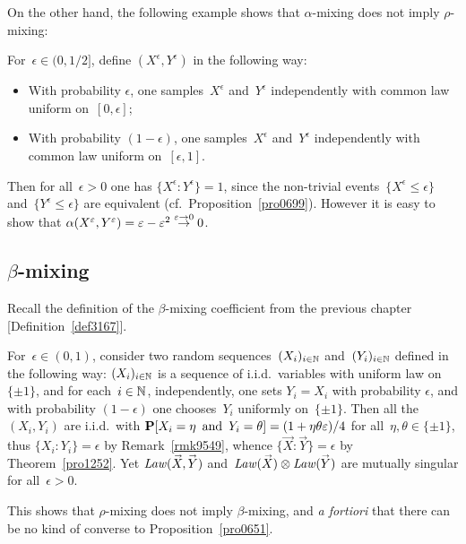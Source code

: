 On the other hand, the following example shows that $\alpha$-mixing does not imply $\rho$-mixing:

\begin{Xpl}\label{x3993}
For~$\epsilon\in (0,1/2]$, define $(X^{\epsilon},Y^{\epsilon})$ in the following way:
\begin{itemize}
\item With probability $\epsilon$, one samples~$X^{\epsilon}$ and~$Y^{\epsilon}$ independently
with common law uniform on~$[0,\epsilon]$;
\item With probability $(1-\epsilon)$, one samples~$X^{\epsilon}$ and~$Y^{\epsilon}$ independently
with common law uniform on~$[\epsilon,1]$.
\end{itemize}
Then for all~$\epsilon>0$ one has $\{X^{\epsilon}:Y^{\epsilon}\}=1$,
since the non-trivial events~${\{X^\epsilon\leq\epsilon\}}$ and~${\{Y^\epsilon\leq\epsilon\}}$
are equivalent (cf.\ Proposition~\ref{pro0699}).
However it is easy to show that $\alpha(X^\varepsilon,Y^\varepsilon) = \varepsilon-\varepsilon^2
\stackrel{\varepsilon\to0}{\to} 0$.
\end{Xpl}


\subsection{\texorpdfstring{$\beta$}{beta}-mixing}

Recall the definition of the $\beta$-mixing coefficient from the previous chapter
[Definition~\ref{def3167}].

\begin{Xpl}\label{xpl9506}
For~$\epsilon \in (0,1)$, consider two random sequences~$(X_i)_{i\in\mathbb{N}}$ and~$(Y_i)_{i\in\mathbb{N}}$
defined in the following way: $(X_i)_{i\in\mathbb{N}}$ is a sequence of i.i.d.\ variables with uniform law on~$\{\pm1\}$,
and for each~$i\in\mathbb{N}$, independently, one sets
$Y_i = X_i$ with probability $\epsilon$, and with probability $(1-\epsilon)$
one chooses~$Y_i$ uniformly on~$\{\pm1\}$.
Then all the~$(X_i,Y_i)$ are i.i.d.\ 
with $\Pr[X_i=\eta \enskip\text{and}\enskip Y_i=\theta] = (1+\eta\theta\epsilon)/4$
for all~$\eta,\theta\in\{\pm1\}$, thus $\{X_i:Y_i\} = \epsilon$
by Remark~\ref{rmk9549}, whence $\{\vec{X}:\vec{Y}\} = \epsilon$ by Theorem~\ref{pro1252}.
Yet $\Law(\vec{X},\vec{Y})$ and~$\Law(\vec{X})\otimes\Law(\vec{Y})$
are mutually singular for all~$\epsilon>0$.

This shows that $\rho$-mixing does not imply $\beta$-mixing,
and \emph{a fortiori} that there can be no kind of converse to Proposition~\ref{pro0651}.
\end{Xpl}


